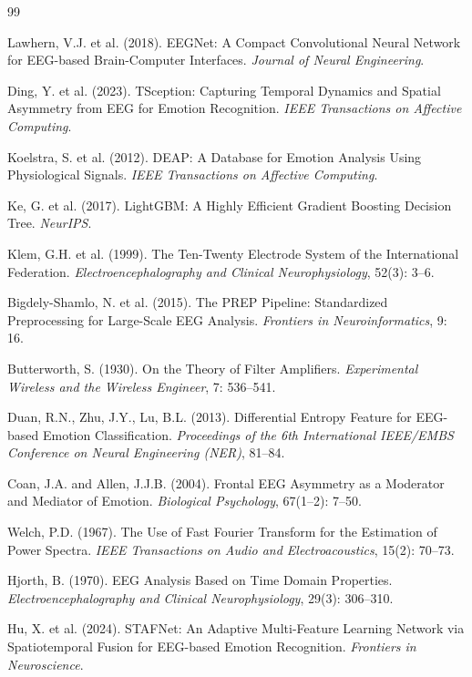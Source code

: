 \documentclass[UTF8,zihao=-4,fontset=windows]{ctexart}
\numberwithin{equation}{section}
\numberwithin{figure}{section}
\numberwithin{table}{section}
\begin{document}
{}
\begin{thebibliography}{99}

Lawhern, V.J. et al. (2018). EEGNet: A Compact Convolutional Neural Network for EEG-based Brain-Computer Interfaces. \textit{Journal of Neural Engineering}.

Ding, Y. et al. (2023). TSception: Capturing Temporal Dynamics and Spatial Asymmetry from EEG for Emotion Recognition. \textit{IEEE Transactions on Affective Computing}.

Koelstra, S. et al. (2012). DEAP: A Database for Emotion Analysis Using Physiological Signals. \textit{IEEE Transactions on Affective Computing}.

Ke, G. et al. (2017). LightGBM: A Highly Efficient Gradient Boosting Decision Tree. \textit{NeurIPS}.

Klem, G.H. et al. (1999). The Ten-Twenty Electrode System of the International Federation. \textit{Electroencephalography and Clinical Neurophysiology}, 52(3): 3--6.

Bigdely-Shamlo, N. et al. (2015). The PREP Pipeline: Standardized Preprocessing for Large-Scale EEG Analysis. \textit{Frontiers in Neuroinformatics}, 9: 16.

Butterworth, S. (1930). On the Theory of Filter Amplifiers. \textit{Experimental Wireless and the Wireless Engineer}, 7: 536--541.

Duan, R.N., Zhu, J.Y., Lu, B.L. (2013). Differential Entropy Feature for EEG-based Emotion Classification. \textit{Proceedings of the 6th International IEEE/EMBS Conference on Neural Engineering (NER)}, 81--84.

Coan, J.A. and Allen, J.J.B. (2004). Frontal EEG Asymmetry as a Moderator and Mediator of Emotion. \textit{Biological Psychology}, 67(1--2): 7--50.

Welch, P.D. (1967). The Use of Fast Fourier Transform for the Estimation of Power Spectra. \textit{IEEE Transactions on Audio and Electroacoustics}, 15(2): 70--73.

Hjorth, B. (1970). EEG Analysis Based on Time Domain Properties. \textit{Electroencephalography and Clinical Neurophysiology}, 29(3): 306--310.

Hu, X. et al. (2024). STAFNet: An Adaptive Multi-Feature Learning Network via Spatiotemporal Fusion for EEG-based Emotion Recognition. \textit{Frontiers in Neuroscience}.

\end{thebibliography}
\end{document}
